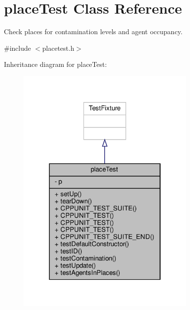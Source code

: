 \hypertarget{classplaceTest}{}\section{place\+Test Class Reference}
\label{classplaceTest}


Check places for contamination levels and agent occupancy.  




{\ttfamily \#include $<$placetest.\+h$>$}



Inheritance diagram for place\+Test\+:\nopagebreak
\begin{figure}[H]
\begin{center}
\leavevmode
\includegraphics[width=250pt]{classplaceTest__inherit__graph}
\end{center}
\end{figure}


